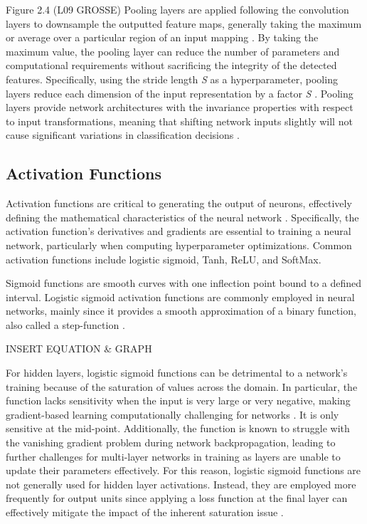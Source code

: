 \documentclass{article}
\begin{document}
Figure 2.4 (L09 GROSSE)
Pooling layers are applied following the convolution layers to downsample the outputted feature maps, generally taking the maximum or average over a particular region of an input mapping \cite{grosse2019lecture09,amidi_amidi}. By taking the maximum value, the pooling layer can reduce the number of parameters and computational requirements without sacrificing the integrity of the detected features. Specifically, using the stride length \emph{S} as a hyperparameter, pooling layers reduce each dimension of the input representation by a factor \emph{S} \cite{grosse2019lecture09}. Pooling layers provide network architectures with the invariance properties with respect to input transformations, meaning that shifting network inputs slightly will not cause significant variations in classification decisions \cite{grosse2019lecture09}. 

\subsection{Activation Functions}
Activation functions are critical to generating the output of neurons, effectively defining the mathematical characteristics of the neural network \cite{lederer2021activation}. Specifically, the activation function’s derivatives and gradients are essential to training a neural network, particularly when computing hyperparameter optimizations. Common activation functions include logistic sigmoid, Tanh, ReLU, and SoftMax. 

Sigmoid functions are smooth curves with one inflection point bound to a defined interval. Logistic sigmoid activation functions are commonly employed in neural networks, mainly since it provides a smooth approximation of a binary function, also called a step-function \cite{lederer2021activation}. 

INSERT EQUATION \& GRAPH

For hidden layers, logistic sigmoid functions can be detrimental to a network’s training because of the saturation of values across the domain. In particular, the function lacks sensitivity when the input is very large or very negative, making gradient-based learning computationally challenging for networks \cite{Goodfellow-et-al-2016}. It is only sensitive at the mid-point. Additionally, the function is known to struggle with the vanishing gradient problem during network backpropagation, leading to further challenges for multi-layer networks in training as layers are unable to update their parameters effectively. For this reason, logistic sigmoid functions are not generally used for hidden layer activations. Instead, they are employed more frequently for output units since applying a loss function at the final layer can effectively mitigate the impact of the inherent saturation issue \cite{Goodfellow-et-al-2016}. 
\end{document}
